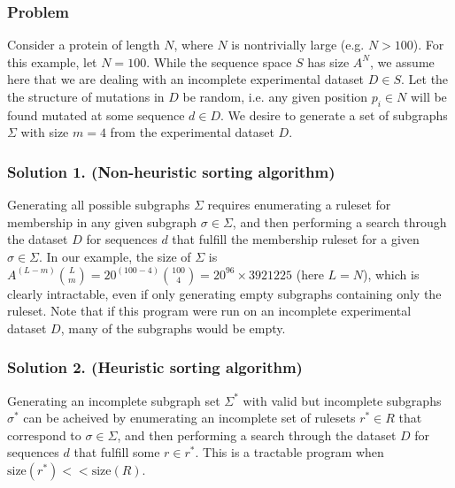 \documentclass[10pt, reqno]{amsart}
\begin{document}
\subsubsection*{Problem} Consider a protein of length $N$, where $N$ is nontrivially large (e.g. $N > 100$). For this example, let $N=100$. While the sequence space $S$ has size $A^N$, we assume here that we are dealing with an incomplete experimental dataset $D \in S$. Let the the structure of mutations in $D$ be random, i.e. any given position $p_i \in N$ will be found mutated at some sequence $d \in D$. We desire to generate a set of subgraphs $\Sigma$ with size $m = 4$ from the experimental dataset $D$. \\


\subsubsection*{Solution 1. (Non-heuristic sorting algorithm)}
Generating all possible subgraphs $\Sigma$ requires enumerating a ruleset for membership in any given subgraph $\sigma \in \Sigma$, and then performing a search through the dataset $D$ for sequences $d$ that fulfill the membership ruleset for a given $\sigma \in \Sigma$. In our example, the size of $\Sigma$ is  $A^{(L-m)}{L \choose m} = 20^{(100-4)}{100 \choose 4} = 20^{96} \times 3921225$ (here $L=N$), which is clearly intractable, even if only generating empty subgraphs containing only the ruleset. Note that if this program were run on an incomplete experimental dataset $D$, many of the subgraphs would be empty. \\


\subsubsection*{Solution 2. (Heuristic sorting algorithm)} 

Generating an incomplete subgraph set $\Sigma^*$ with valid but incomplete subgraphs $\sigma ^*$ can be acheived by enumerating an incomplete set of rulesets $r^* \in R$ that correspond to $\sigma \in \Sigma$, and then performing a search through the dataset $D$ for sequences $d$ that fulfill some $r \in r^*$. This is a tractable program when $\text{size}(r^*) << \text{size}(R)$.  




\printbibliography
\end{document}
